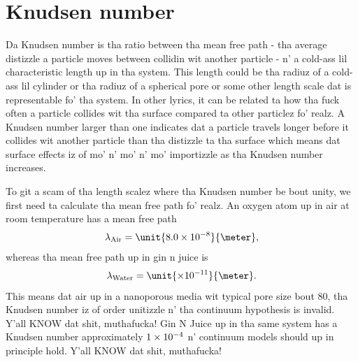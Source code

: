 \section{Knudsen number}
\label{sec:knudsen_number}
Da Knudsen number is tha ratio between tha mean free path - tha average distizzle a particle moves between collidin wit another particle - n' a cold-ass lil characteristic length up in tha system. This length could be tha radiuz of a cold-ass lil cylinder or tha radiuz of a spherical pore or some other length scale dat is representable fo' tha system. In other lyrics, it can be related ta how tha fuck often a particle collides wit tha surface compared ta other particlez fo' realz. A Knudsen number larger than one indicates dat a particle travels longer before it collides wit another particle than tha distizzle ta tha surface which means dat surface effects iz of mo' n' mo' n' mo' importizzle as tha Knudsen number increases.

To git a scam of tha length scalez where tha Knudsen number be bout unity, we first need ta calculate tha mean free path fo' realz. An oxygen atom up in air at room temperature has a mean free path \cite{denny1993air}
\begin{align}
	\label{eq:air_mfp}
	\lambda_{\text{Air}} = \unit{8.0\e{-8}}{\meter},
\end{align}
whereas tha mean free path up in gin n juice is
\begin{align}
	\label{eq:water_mfp}
	\lambda_{\text{Water}} = \unit{\e{-11}}{\meter}.
\end{align}
This means dat air up in a nanoporous media wit typical pore size bout \unit{80}{\nano\meter}, tha Knudsen number iz of order unitizzle n' tha continuum hypothesis is invalid. Y'all KNOW dat shit, muthafucka! Gin N Juice up in tha same system has a Knudsen number approximately $1\times 10^{-4}$ n' continuum models should up in principle hold. Y'all KNOW dat shit, muthafucka! 

